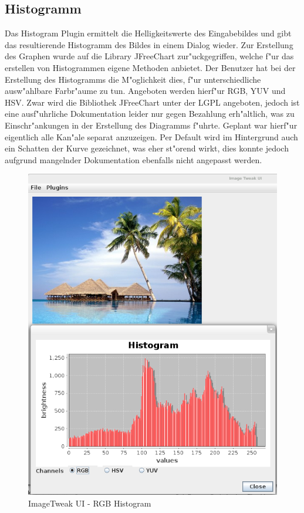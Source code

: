\documentclass[a4paper]{article}
\begin{document}
\newpage
\subsection{Histogramm}
Das Histogram Plugin ermittelt die Helligkeitswerte des Eingabebildes und gibt das resultierende Histogramm des Bildes in einem Dialog wieder. Zur Erstellung des Graphen wurde auf die Library JFreeChart zur"uckgegriffen, welche f"ur das erstellen von Histogrammen eigene Methoden anbietet. Der Benutzer hat bei der Erstellung des Histogramms die M"oglichkeit dies, f"ur unterschiedliche ausw"ahlbare Farbr"aume zu tun. Angeboten werden hierf"ur RGB, YUV und HSV. Zwar wird die Bibliothek JFreeChart unter der LGPL angeboten, jedoch ist eine ausf"uhrliche Dokumentation leider nur gegen Bezahlung erh"altlich, was zu Einschr"ankungen in der Erstellung des Diagramms f"uhrte. Geplant war hierf"ur eigentlich alle Kan"ale separat anzuzeigen. Per Default wird im Hintergrund auch ein Schatten der Kurve gezeichnet, was eher st"orend wirkt, dies konnte jedoch aufgrund mangelnder Dokumentation ebenfalls nicht angepasst werden.

\begin{figure}[htp]
\centering
\includegraphics[scale=0.50]{histogram.png}
\caption{ImageTweak UI - RGB Histogram}
\label{ImageTweak UI - RGB Histogram}
\end{figure}
\end{document}
